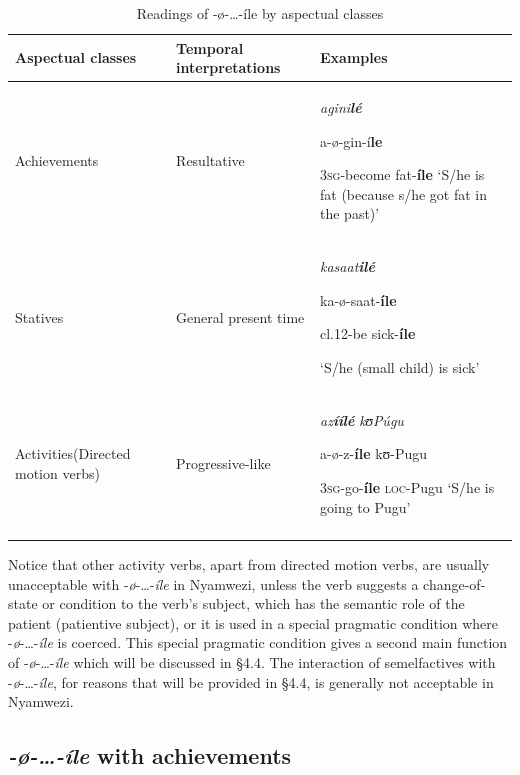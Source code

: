 \documentclass[output=paper,newtxmath,modfonts,nonflat,draftmode]{langsci/langscibook}
\begin{document}
\begin{table}
\caption{Readings of -ø-…-íle by aspectual classes}
\label{tab:kanijo:2}
\begin{tabularx}{\textwidth}{QQp{39mm}}
\lsptoprule
\bfseries Aspectual classes & \bfseries Temporal interpretations & \bfseries Examples \\
\midrule 
Achievements & Resultative & \textit{agini}\textbf{\textit{lé}} 

a-ø-gin-í\textbf{le} 

3\textsc{sg}-become fat-\textbf{íle} 
‘S/he is fat (because s/he got fat in the past)’\\

\tablevspace
Statives & General present time & \textit{kasaat}\textbf{\textit{i}}\textbf{\textit{lé}} 

ka\footnotemark{}-ø-saat-\textbf{íle} 

cl.12-be sick-\textbf{íle}

‘S/he (small child) is sick’\\

\tablevspace
Activities\newline (Directed motion verbs) & Progressive-like & \textit{az}\textbf{\textit{íílé}         }\textit{kʊ}\textit{Púgu}

a-ø-z-\textbf{íle}    kʊ-Pugu

3\textsc{sg}-go-\textbf{íle} \textsc{loc}-Pugu 
‘S/he is going to Pugu’\\
\lspbottomrule
\end{tabularx}
\end{table} 


Notice that other activity verbs, apart from directed motion verbs, are usually unacceptable with -\textit{ø}-…-\textit{íle} in Nyamwezi, unless the verb suggests a change-of-state or condition to the verb’s subject, which has the semantic role of the patient (patientive subject), or it is used in a special pragmatic condition where -\textit{ø}-…-\textit{íle} is coerced. This special pragmatic condition gives a second main function of -\textit{ø}-…-\textit{íle} which will be discussed in §4.4. The interaction of semelfactives with -\textit{ø}-…-\textit{íle}, for reasons that will be provided in §4.4, is generally not acceptable in Nyamwezi. 
 
\subsection{\textit{-}\textit{ø-\ldots-íle} with achievements}
\end{document}
